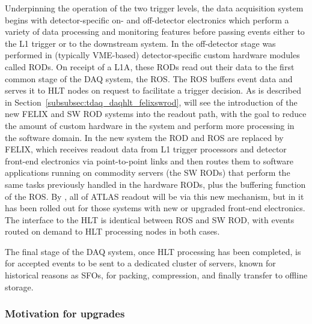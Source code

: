 \documentclass[cernpreprint, atlasdraft=false, UKenglish,british,orcidlogo, texmf, orcidlogo]{atlasdoc}
\begin{document}
Underpinning the operation of the two trigger levels, the data acquisition system begins with detector-specific on- and off-detector electronics which perform a variety of data processing and monitoring features before passing events either to the \gls{L1} trigger or to the downstream system. In \RunOneTwo the off-detector stage was performed in (typically \gls{VME}-based) detector-specific custom hardware modules called \glspl{ROD}. On receipt of a \gls{L1A}, these \glspl{ROD} read out their data to the first common stage of the \gls{DAQ} system, the \gls{ROS}. The \gls{ROS} buffers event data and serves it to \gls{HLT} nodes on request to facilitate a trigger decision. As is described in Section~\ref{subsubsec:tdaq_daqhlt_felixswrod}, \RunThr will see the introduction of the new \gls{FELIX} and \gls{SW ROD}  systems into the readout path, with the goal to reduce the amount of custom hardware in the system and perform more processing in the software domain. In the new system the \gls{ROD} and \gls{ROS} are replaced by \gls{FELIX}, which receives readout data from \gls{L1} trigger processors  and detector front-end electronics via point-to-point links and then routes them to software applications running on commodity servers (the \glspl{SW ROD}) that perform the same tasks previously handled in the hardware \glspl{ROD}, plus the buffering function of the \gls{ROS}. By \RunFour, all of ATLAS readout will be via this new mechanism, but in \RunThr it has been rolled out for those systems with new or upgraded front-end electronics. The interface to the \gls{HLT} is identical between \gls{ROS} and \gls{SW ROD}, with events routed on demand to \gls{HLT} processing nodes in both cases.
 
The final stage of the \gls{DAQ} system, once \gls{HLT} processing has been completed, is for accepted events to be sent to a dedicated cluster of servers, known for historical reasons as \glspl{SFO}, for packing, compression, and finally transfer to offline storage.
 
\subsubsection{Motivation for upgrades}
 
\end{document}
